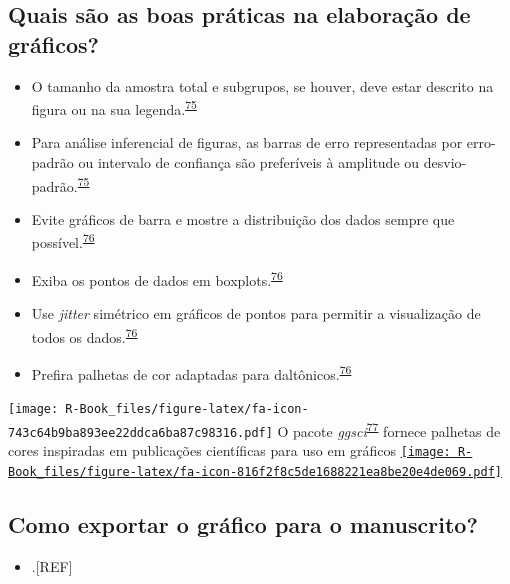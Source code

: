 \documentclass[
]{book}
\providecommand{\tightlist}{%
  \setlength{\itemsep}{0pt}\setlength{\parskip}{0pt}}
\begin{document}
\hypertarget{quais-suxe3o-as-boas-pruxe1ticas-na-elaborauxe7uxe3o-de-gruxe1ficos}{%
\subsection{Quais são as boas práticas na elaboração de gráficos?}\label{quais-suxe3o-as-boas-pruxe1ticas-na-elaborauxe7uxe3o-de-gruxe1ficos}}

\begin{itemize}
\item
  O tamanho da amostra total e subgrupos, se houver, deve estar descrito na figura ou na sua legenda.\textsuperscript{\protect\hyperlink{ref-Cumming2007}{75}}
\item
  Para análise inferencial de figuras, as barras de erro representadas por erro-padrão ou intervalo de confiança são preferíveis à amplitude ou desvio-padrão.\textsuperscript{\protect\hyperlink{ref-Cumming2007}{75}}
\item
  Evite gráficos de barra e mostre a distribuição dos dados sempre que possível.\textsuperscript{\protect\hyperlink{ref-Weissgerber2019}{76}}
\item
  Exiba os pontos de dados em boxplots.\textsuperscript{\protect\hyperlink{ref-Weissgerber2019}{76}}
\item
  Use \emph{jitter} simétrico em gráficos de pontos para permitir a visualização de todos os dados.\textsuperscript{\protect\hyperlink{ref-Weissgerber2019}{76}}
\item
  Prefira palhetas de cor adaptadas para daltônicos.\textsuperscript{\protect\hyperlink{ref-Weissgerber2019}{76}}
\end{itemize}

\texttt{[image: R-Book\_files/figure-latex/fa-icon-743c64b9ba893ee22ddca6ba87c98316.pdf]} O pacote \emph{ggsci}\textsuperscript{\protect\hyperlink{ref-ggsci}{77}} fornece palhetas de cores inspiradas em publicações científicas para uso em gráficos \href{https://cran.r-project.org/web/packages/ggsci/index.html}{\texttt{[image: R-Book\_files/figure-latex/fa-icon-816f2f8c5de1688221ea8be20e4de069.pdf]}}

\hypertarget{como-exportar-o-gruxe1fico-para-o-manuscrito}{%
\subsection{Como exportar o gráfico para o manuscrito?}\label{como-exportar-o-gruxe1fico-para-o-manuscrito}}

\begin{itemize}
\tightlist
\item
  .{[}REF{]}
\end{itemize}
\end{document}
